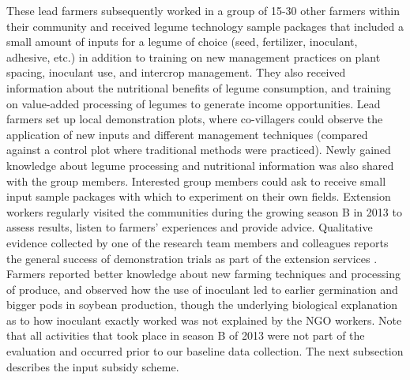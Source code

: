 These lead farmers subsequently worked in a group of 15-30 other farmers within their community and received legume technology sample packages that included a small amount of inputs for a legume of choice (seed, fertilizer, inoculant, adhesive, etc.) in addition to training on new management practices on plant spacing, inoculant use, and intercrop management. They also received information about the nutritional benefits of legume consumption, and training on value-added processing of legumes to generate income opportunities. 
Lead farmers set up local demonstration plots, where co-villagers could observe the application of new inputs and different management techniques (compared against a control plot where traditional methods were practiced). Newly gained knowledge about legume processing and nutritional information was also shared with the group members. Interested group members could ask to receive small input sample packages with which to experiment on their own fields. Extension workers regularly visited the communities during the growing season B in 2013 to assess results, listen to farmers’ experiences and provide advice. Qualitative evidence collected by one of the research team members and colleagues reports the general success of demonstration trials as part of the extension services \citep[see][]{Kendzior2015}. Farmers reported better knowledge about new farming techniques and processing of produce, and observed how the use of inoculant led to earlier germination and bigger pods in soybean production, though the underlying biological explanation as to how inoculant exactly worked was not explained by the NGO workers. Note that all activities that took place in season B of 2013 were not part of the evaluation and occurred prior to our baseline data collection. The next subsection describes the input subsidy scheme.

